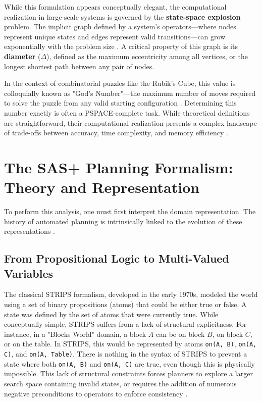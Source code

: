 \documentclass[12pt,a4paper]{report}
\begin{document}
While this formulation appears conceptually elegant, the computational realization in large-scale systems is governed by the \textbf{state-space explosion} problem. The implicit graph defined by a system's operators—where nodes represent unique states and edges represent valid transitions—can grow exponentially with the problem size \cite{decoupled}. A critical property of this graph is its \textbf{diameter} ($\Delta$), defined as the maximum eccentricity among all vertices, or the longest shortest path between any pair of nodes.

In the context of combinatorial puzzles like the Rubik's Cube, this value is colloquially known as "God's Number"—the maximum number of moves required to solve the puzzle from any valid starting configuration \cite{mathworld}. Determining this number exactly is often a PSPACE-complete task. While theoretical definitions are straightforward, their computational realization presents a complex landscape of trade-offs between accuracy, time complexity, and memory efficiency \cite{stanfordLec}.

\section{The SAS+ Planning Formalism: Theory and Representation}
To perform this analysis, one must first interpret the domain representation. The history of automated planning is intrinsically linked to the evolution of these representations \cite{saarland}.

\subsection*{From Propositional Logic to Multi-Valued Variables}
The classical STRIPS formalism, developed in the early 1970s, modeled the world using a set of binary propositions (atoms) that could be either true or false. A state was defined by the set of atoms that were currently true. While conceptually simple, STRIPS suffers from a lack of structural explicitness. For instance, in a "Blocks World" domain, a block $A$ can be on block $B$, on block $C$, or on the table. In STRIPS, this would be represented by atoms \texttt{on(A, B)}, \texttt{on(A, C)}, and \texttt{on(A, Table)}. There is nothing in the syntax of STRIPS to prevent a state where both \texttt{on(A, B)} and \texttt{on(A, C)} are true, even though this is physically impossible. This lack of structural constraints forces planners to explore a larger search space containing invalid states, or requires the addition of numerous negative preconditions to operators to enforce consistency \cite{saarland}.
\end{document}

